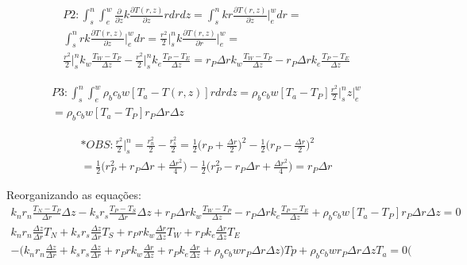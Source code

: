 \documentclass[11pt]{extarticle}
\begin{document}
\begin{gather}                                           
P2:\int_{s}^{n} \int_{e}^{w}\frac{\partial}{\partial z}k \frac{\partial T(r,z)}{\partial z}rdrdz=\int_{s}^{n} k r \frac{\partial T(r,z)}{\partial z} \biggr\rvert^{w}_{e} dr= \\
\int_{s}^{n} r k  \frac{\partial T(r,z)}{\partial z} \biggr\rvert^{w}_{e} dr=  \frac{r^2}{2}\biggr\rvert^{n}_{s} k \frac{\partial T(r,z)}{\partial r} \biggr\rvert^{w}_{e}=\\ \frac{r^2}{2}\biggr\rvert^{n}_{s}k_w \frac{T_W-T_P}{\Delta z} -\frac{r^2}{2}\biggr\rvert^{n}_{s}k_e \frac{T_P-T_E}{\Delta z} 
=r_P \Delta r k_w \frac{T_W-T_P}{\Delta z} -r_P \Delta r k_e \frac{T_P-T_E}{\Delta z}
\end{gather}   

\begin{gather}                                           
P3:\int_{s}^{n} \int_{e}^{w} \rho_b c_b w [T_a-T(r,z)]rdrdz = \rho_b c_b w [T_a-T_P]\frac{r^2}{2}\biggr\rvert^{n}_{s}z\biggr\rvert^{w}_{e}\\ =\rho_b c_b w [T_a-T_P]r_P \Delta r\Delta z
\end{gather} 
   
\begin{gather}                                           
*OBS:\frac{r^2}{2}\biggr\rvert^{n}_{s}=\frac{r_{n}^2}{2}-\frac{r_{s}^2}{2}=\frac{1}{2}\biggr(r_P+\frac{\Delta r}{2}\biggr)^2-\frac{1}{2}\biggr(r_P-\frac{\Delta r}{2}\biggr)^2\\
=\frac{1}{2}\biggr(r_P^2+r_P\Delta r+\frac{\Delta r ^2}{4}\biggr)-\frac{1}{2}\biggr(r_P^2-r_P\Delta r+\frac{\Delta r ^2}{4}\biggr)=r_P\Delta r
\end{gather}    

Reorganizando as equações:
\begin{gather}                                           
k_n r_n \frac{T_N-T_P}{\Delta r}\Delta z-k_s r_s  \frac{T_P-T_S}{\Delta r}\Delta z +r_P \Delta r k_w \frac{T_W-T_P}{\Delta z} -r_P \Delta r k_e \frac{T_P-T_E}{\Delta z}+\rho_b c_b w [T_a-T_P]r_P \Delta r\Delta z=0\\
k_n r_n \frac{\Delta z}{\Delta r}T_N+k_s r_s \frac{\Delta z}{\Delta r}T_S+r_P  r k_w \frac{\Delta r}{\Delta z}T_W+r_P k_e \frac{\Delta r}{\Delta z}T_E \\-\biggr( k_n r_n \frac{\Delta z}{\Delta r}+k_s r_s \frac{\Delta z}{\Delta r}+r_P  r k_w \frac{\Delta r}{\Delta z}+r_P k_e \frac{\Delta r}{\Delta z}+\rho_b c_b wr_P \Delta r\Delta z)Tp+\rho_b c_b wr_P \Delta r\Delta z T_a=0 \biggr (
\end{gather}   
\end{document}
